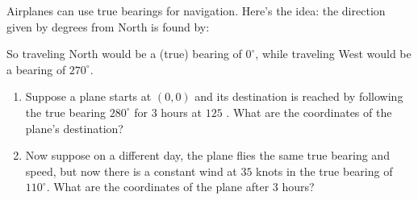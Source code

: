\documentclass{ximera}
\begin{document}
\begin{example}[Navigation]
  Airplanes can use true bearings for navigation. Here's the idea: the
  direction given by degrees from North is found by:

\begin{center}
\upshape
\def\radius{2cm}
\def\onedegrad{1.8cm}
\def\fivedegrad{1.75cm}
\def\tendegrad{1.7cm}
\def\labelrad{1.6cm}

\end{center}

So traveling North would be a (true) bearing of $0^\circ$, while
traveling West would be a bearing of $270^\circ$.
\begin{enumerate}
\item Suppose a plane starts at $(0,0)$ and its destination is reached
  by following the true bearing $280^\circ$ for $3$ hours at $125$
  .  What are
  the coordinates of the plane's destination?
\item Now suppose on a different day, the plane flies the same true
  bearing and speed, but now there is a constant wind at $35$ knots in
  the true bearing of $110^\circ$. What are the coordinates of the plane
  after $3$ hours?
\end{enumerate}


\end{example}
\end{document}
